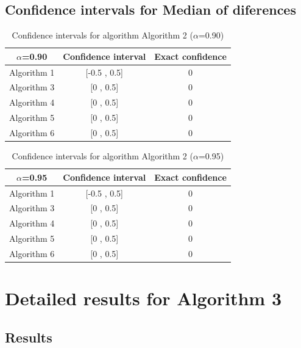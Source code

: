 \documentclass[a4paper,10pt]{article}
\begin{document}
\subsection{Confidence intervals for Median of diferences}

\begin{table}[!htp]
\centering\small
\begin{tabular}{
|c|c|c|}
\hline
 $\alpha$=0.90 & Confidence interval & Exact confidence \\ \hline 
Algorithm 1 & [-0.5 , 0.5] & 0\\ \hline 
Algorithm 3 & [0 , 0.5] & 0\\ \hline 
Algorithm 4 & [0 , 0.5] & 0\\ \hline 
Algorithm 5 & [0 , 0.5] & 0\\ \hline 
Algorithm 6 & [0 , 0.5] & 0\\ \hline 

\end{tabular}
\caption{Confidence intervals for algorithm Algorithm 2 ($\alpha$=0.90)}
\end{table}
\begin{table}[!htp]
\centering\small
\begin{tabular}{
|c|c|c|}
\hline
 $\alpha$=0.95 & Confidence interval & Exact confidence \\ \hline 
Algorithm 1 & [-0.5 , 0.5] & 0\\ \hline 
Algorithm 3 & [0 , 0.5] & 0\\ \hline 
Algorithm 4 & [0 , 0.5] & 0\\ \hline 
Algorithm 5 & [0 , 0.5] & 0\\ \hline 
Algorithm 6 & [0 , 0.5] & 0\\ \hline 

\end{tabular}
\caption{Confidence intervals for algorithm Algorithm 2 ($\alpha$=0.95)}
\end{table}

 \clearpage 


\section{Detailed results for Algorithm 3}


\subsection{Results}
\end{document}
